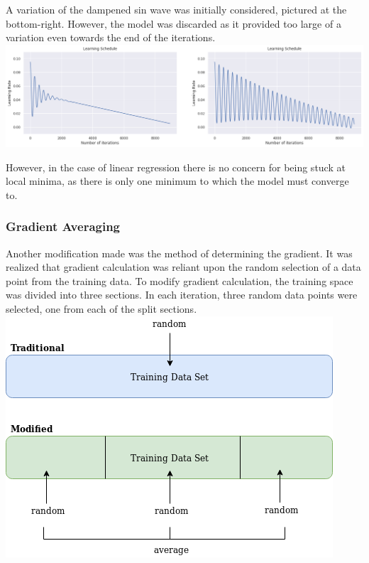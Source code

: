 \documentclass[onecolumn]{article}
\begin{document}
A variation of the dampened sin wave was initially considered, pictured at the bottom-right. However, the model was discarded as it provided too large of a variation even towards the end of the iterations.\\

\begingroup
    \centering
    \medskip
    \includegraphics[width=\columnwidth]{Tex/mp1_images/schedule2.png}
    \medskip
\endgroup
\medskip

However, in the case of linear regression there is no concern for being stuck at local minima, as there is only one minimum to which the model must converge to.

\subsubsection{Gradient Averaging}

Another modification made was the method of determining the gradient. It was realized that gradient calculation was reliant upon the random selection of a data point from the training data. To modify gradient calculation, the training space was divided into three sections. In each iteration, three random data points were selected, one from each of the split sections. \\

\begingroup
    \centering
    \medskip
    \includegraphics[width=0.4\columnwidth]{Tex/mp1_images/avg.png}
    \medskip
\endgroup
\medskip
\end{document}
